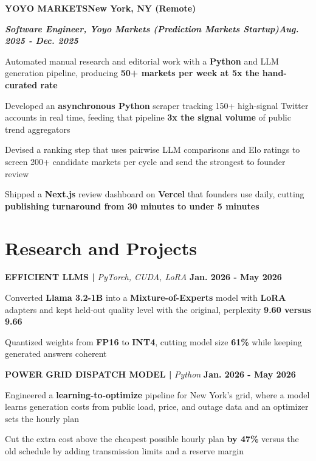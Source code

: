 \documentclass[10pt]{article}
\newcommand{\job}[4]{%
  \vspace{0pt}%
  \textbf{\MakeUppercase{#1}}\hfill\textbf{#2}\par
  \vspace{0.5pt}%
  \textbf{\textit{#3}}\hfill\textbf{\textit{#4}}\par
}
\newcommand{\proj}[4]{%
  \vspace{3pt}%
  \textbf{\MakeUppercase{#1} | }\textit{#2}\hfill
  \textbf{#4}%
  \notblank{#3}{\ \textbf{| #3}}{}%
  \par
}
\begin{document}
\vspace{3pt}
\job{Yoyo Markets}{New York, NY (Remote)}{Software Engineer, Yoyo Markets (Prediction Markets Startup)}{Aug. 2025 - Dec. 2025}
\begin{bullets}
  \item Automated manual research and editorial work with a \textbf{Python} and LLM generation pipeline, producing \textbf{50+ markets per week at 5x the hand-curated rate}
  \item Developed an \textbf{asynchronous Python} scraper tracking 150+ high-signal Twitter accounts in real time, feeding that pipeline \textbf{3x the signal volume} of public trend aggregators
  \item Devised a ranking step that uses pairwise LLM comparisons and Elo ratings to screen 200+ candidate markets per cycle and send the strongest to founder review
  \item Shipped a \textbf{Next.js} review dashboard on \textbf{Vercel} that founders use daily, cutting \textbf{publishing turnaround from 30 minutes to under 5 minutes}
\end{bullets}

\section{Research and Projects}
\vspace{-3pt}
\proj{Efficient LLMs}{PyTorch, CUDA, LoRA}{USC}{Jan. 2026 - May 2026}
\begin{bullets}
  \item Converted \textbf{Llama 3.2-1B} into a \textbf{Mixture-of-Experts} model with \textbf{LoRA} adapters and kept held-out quality level with the original, perplexity \textbf{9.60 versus 9.66}
  \item Quantized weights from \textbf{FP16} to \textbf{INT4}, cutting model size \textbf{61\%} while keeping generated answers coherent
\end{bullets}

\proj{Power Grid Dispatch Model}{Python}{USC}{Jan. 2026 - May 2026}
\begin{bullets}
  \item Engineered a \textbf{learning-to-optimize} pipeline for New York's grid, where a model learns generation costs from public load, price, and outage data and an optimizer sets the hourly plan
  \item Cut the extra cost above the cheapest possible hourly plan \textbf{by 47\%} versus the old schedule by adding transmission limits and a reserve margin
\end{bullets}
\end{document}
